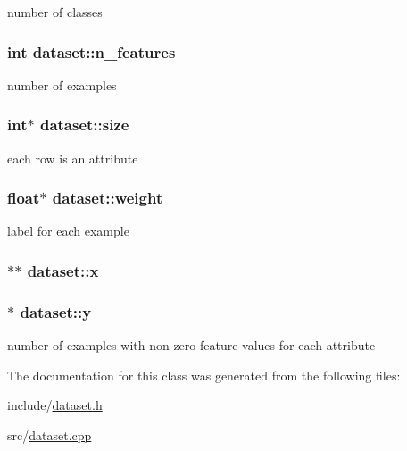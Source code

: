 number of classes \hypertarget{classdataset_a5469ac8f1b5d64d836821e5056599b54}{
\subsubsection[{n\+\_\+features}]{\setlength{\rightskip}{0pt plus 5cm}int dataset\+::n\+\_\+features\hspace{0.3cm}{\ttfamily [private]}}}\label{classdataset_a5469ac8f1b5d64d836821e5056599b54}
number of examples \hypertarget{classdataset_acc18732fc7fbc0fcdebffac620646eb9}{
\subsubsection[{size}]{\setlength{\rightskip}{0pt plus 5cm}int$\ast$ dataset\+::size}}\label{classdataset_acc18732fc7fbc0fcdebffac620646eb9}
each row is an attribute \hypertarget{classdataset_ac6690ca832182b7cfa64da93a6ccd6ab}{
\subsubsection[{weight}]{\setlength{\rightskip}{0pt plus 5cm}float$\ast$ dataset\+::weight}}\label{classdataset_ac6690ca832182b7cfa64da93a6ccd6ab}
label for each example \hypertarget{classdataset_af7977ae76ce8f573f349e63f6500a8f8}{
\subsubsection[{x}]{$\ast$$\ast$ dataset\+::x}}\label{classdataset_af7977ae76ce8f573f349e63f6500a8f8}
\hypertarget{classdataset_a146d2d2d0eaadeb342e76b9bb1004881}{
\subsubsection[{y}]{$\ast$ dataset\+::y}}\label{classdataset_a146d2d2d0eaadeb342e76b9bb1004881}
number of examples with non-\/zero feature values for each attribute 

The documentation for this class was generated from the following files\+:\begin{DoxyCompactItemize}
\item 
include/\hyperlink{dataset_8h}{dataset.\+h}\item 
src/\hyperlink{dataset_8cpp}{dataset.\+cpp}\end{DoxyCompactItemize}
